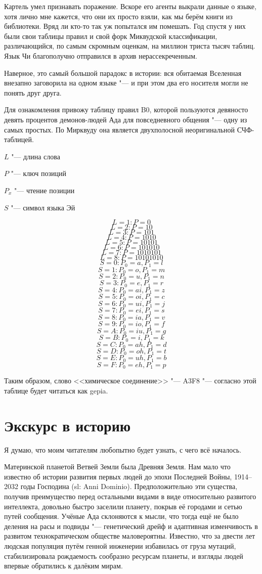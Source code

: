 Картель умел признавать поражение.
Вскоре его агенты выкрали данные о языке, хотя лично мне кажется, что они их просто взяли, как мы берём книги из библиотеки.
Вряд ли кто-то так уж попытался им помешать.
Год спустя у них были свои таблицы правил и свой форк Миквудской классификации, различающийся, по самым скромным оценкам, на миллион триста тысяч таблиц.
Язык Чи благополучно отправился в архив нерассекреченным.

Наверное, это самый большой парадокс в истории: вся обитаемая Вселенная внезапно заговорила на одном языке "--- и при этом два его носителя могли не понять друг друга.

Для ознакомления привожу таблицу правил B0, которой пользуются девяносто девять процентов демонов-людей Ада для повседневного общения "--- одну из самых простых.
По Мирквуду она является двухполосной неоригинальной СЧФ-таблицей.

$L$ "--- длина слова

$P$ "--- ключ позиций

$P_x$ "--- чтение позиции

$S$ "--- символ языка Эй

\[L = 1: P = 0\]
\[L = 2: P = 10\]
\[L = 3: P = 101\]
\[L = 4: P = 1010\]
\[L = 5: P = 10101\]
\[L = 6: P = 101010\]
\[L = 7: P = 1010101\]
\[L = 8: P = 10101010\]
\[S = 0: P_0 = a, P_1 = l\]
\[S = 1: P_0 = o, P_1 = m\]
\[S = 2: P_0 = u, P_1 = n\]
\[S = 3: P_0 = e, P_1 = r\]
\[S = 4: P_0 = ai, P_1 = z\]
\[S = 5: P_0 = oi, P_1 = c\]
\[S = 6: P_0 = ui, P_1 = j\]
\[S = 7: P_0 = ei, P_1 = s\]
\[S = 8: P_0 = ia, P_1 = v\]
\[S = 9: P_0 = io, P_1 = f\]
\[S = A: P_0 = iu, P_1 = g\]
\[S = B: P_0 = i, P_1 = k\]
\[S = C: P_0 = ah, P_1 = d\]
\[S = D: P_0 = oh, P_1 = t\]
\[S = E: P_0 = uh, P_1 = b\]
\[S = F: P_0 = eh, P_1 = p\]

Таким образом, слово <<химическое соединение>> "--- A3F8 "--- согласно этой таблице будет читаться как gepia.

\section{Экскурс в историю}

Я думаю, что моим читателям любопытно будет узнать, с чего всё началось.

Материнской планетой Ветвей Земли была Древняя Земля.
Нам мало что известно об истории развития первых людей до эпохи Последней Войны, 1914--2032 годы Господина (sl: Anni Dominio).
Предположительно эти существа, получив преимущество перед остальными видами в виде относительно развитого интеллекта, довольно быстро заселили планету, покрыв её городами и сетью путей сообщения.
Учёные Ада склоняются к мысли, что тогда ещё не было деления на расы и подвиды "--- генетический дрейф и адаптивная изменчивость в развитом технократическом обществе маловероятны.
Известно, что за двести лет людская популяция путём генной инженерии избавилась от груза мутаций, стабилизировала рождаемость сообразно ресурсам планеты, и взгляды людей впервые обратились к далёким мирам.

